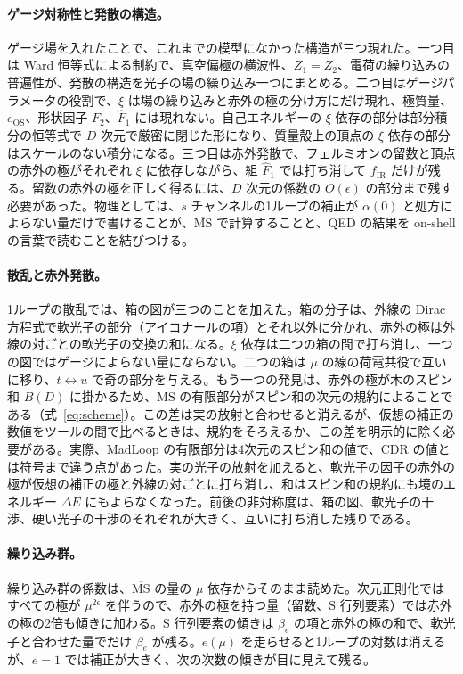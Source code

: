 \documentclass[a4paper,10pt]{ltjsarticle}
\newcommand{\MSbar}{\overline{\mathrm{MS}}}
\begin{document}
\paragraph{ゲージ対称性と発散の構造。}ゲージ場を入れたことで、これまでの模型になかった構造が三つ現れた。一つ目は Ward 恒等式による制約で、真空偏極の横波性、$Z_1=Z_2$、電荷の繰り込みの普遍性が、発散の構造を光子の場の繰り込み一つにまとめる。二つ目はゲージパラメータの役割で、$\xi$ は場の繰り込みと赤外の極の分け方にだけ現れ、極質量、$e_{\mathrm{OS}}$、形状因子 $F_2$、$\hat F_1$ には現れない。自己エネルギーの $\xi$ 依存の部分は部分積分の恒等式で $D$ 次元で厳密に閉じた形になり、質量殻上の頂点の $\xi$ 依存の部分はスケールのない積分になる。三つ目は赤外発散で、フェルミオンの留数と頂点の赤外の極がそれぞれ $\xi$ に依存しながら、組 $\hat F_1$ では打ち消して $f_{\mathrm{IR}}$ だけが残る。留数の赤外の極を正しく得るには、$D$ 次元の係数の $O(\epsilon)$ の部分まで残す必要があった。物理としては、$s$ チャンネルの1ループの補正が $\alpha(0)$ と処方によらない量だけで書けることが、$\MSbar$ で計算することと、QED の結果を on-shell の言葉で読むことを結びつける。

\paragraph{散乱と赤外発散。}1ループの散乱では、箱の図が三つのことを加えた。箱の分子は、外線の Dirac 方程式で軟光子の部分（アイコナールの項）とそれ以外に分かれ、赤外の極は外線の対ごとの軟光子の交換の和になる。$\xi$ 依存は二つの箱の間で打ち消し、一つの図ではゲージによらない量にならない。二つの箱は $\mu$ の線の荷電共役で互いに移り、$t\leftrightarrow u$ で奇の部分を与える。もう一つの発見は、赤外の極が木のスピン和 $B(D)$ に掛かるため、$\MSbar$ の有限部分がスピン和の次元の規約によることである（式~\eqref{eq:scheme}）。この差は実の放射と合わせると消えるが、仮想の補正の数値をツールの間で比べるときは、規約をそろえるか、この差を明示的に除く必要がある。実際、MadLoop の有限部分は4次元のスピン和の値で、CDR の値とは符号まで違う点があった。実の光子の放射を加えると、軟光子の因子の赤外の極が仮想の補正の極と外線の対ごとに打ち消し、和はスピン和の規約にも境のエネルギー $\Delta E$ にもよらなくなった。前後の非対称度は、箱の図、軟光子の干渉、硬い光子の干渉のそれぞれが大きく、互いに打ち消した残りである。

\paragraph{繰り込み群。}繰り込み群の係数は、$\MSbar$ の量の $\mu$ 依存からそのまま読めた。次元正則化ではすべての極が $\mu^{2\epsilon}$ を伴うので、赤外の極を持つ量（留数、S 行列要素）では赤外の極の2倍も傾きに加わる。S 行列要素の傾きは $\beta_e$ の項と赤外の極の和で、軟光子と合わせた量でだけ $\beta_e$ が残る。$e(\mu)$ を走らせると1ループの対数は消えるが、$e=1$ では補正が大きく、次の次数の傾きが目に見えて残る。
\end{document}
